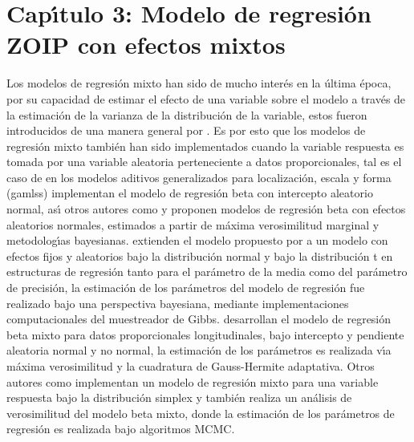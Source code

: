 \chapter{Cap\'{\i}tulo 3: Modelo de regresi\'{o}n ZOIP con efectos mixtos}

Los modelos de regresi\'{o}n mixto han sido de mucho inter\'{e}s en la \'{u}ltima \'{e}poca, por su capacidad de estimar el efecto de una variable sobre el modelo a trav\'{e}s de la estimaci\'{o}n de la varianza de la distribuci\'{o}n de la variable, estos fueron introducidos de una manera general por \cite{Laird1}. Es por esto que los modelos de regresi\'{o}n mixto tambi\'{e}n han sido implementados cuando la variable respuesta es tomada por una variable aleatoria perteneciente a datos proporcionales, tal es el caso de \cite{Stasinopoulos2} en los modelos aditivos generalizados para localizaci\'{o}n, escala y forma (gamlss) implementan el modelo de regresi\'{o}n beta con intercepto aleatorio normal, as\'{\i} otros autores como \cite{Verkuilen1} y \cite{Bonat1} proponen modelos de regresi\'{o}n beta con efectos aleatorios normales, estimados a partir de m\'{a}xima verosimilitud marginal y metodolog\'{\i}as bayesianas. \cite{Figueroa1} extienden el modelo propuesto por \cite{Ferrari2} a un modelo con efectos fijos y aleatorios bajo la distribuci\'{o}n normal y bajo la distribuci\'{o}n t en estructuras de regresi\'{o}n tanto para el par\'{a}metro de la media como del par\'{a}metro de precisi\'{o}n, la estimaci\'{o}n de los par\'{a}metros del modelo de regresi\'{o}n fue realizado bajo una perspectiva bayesiana, mediante implementaciones computacionales del muestreador de Gibbs. \cite{Usuga1} desarrollan el modelo de regresi\'{o}n beta mixto para datos proporcionales longitudinales, bajo intercepto y pendiente aleatoria normal y no normal, la estimaci\'{o}n de los par\'{a}metros es realizada v\'{\i}a m\'{a}xima verosimilitud y la cuadratura de Gauss-Hermite adaptativa. Otros autores como \cite{Song1} implementan un modelo de regresi\'{o}n mixto para una variable respuesta bajo la distribuci\'{o}n simplex y \cite{Bonat2} tambi\'{e}n realiza un an\'{a}lisis de verosimilitud del modelo beta mixto, donde la estimaci\'{o}n de los par\'{a}metros de regresi\'{o}n es realizada bajo algoritmos MCMC.\\

